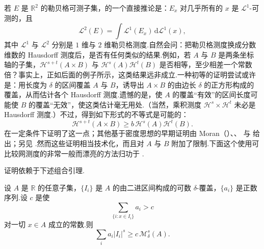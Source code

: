 若 $E$ 是 $\mathbb{R}^2$ 的勒贝格可测子集，的一个直接推论是：$E_x$ 对几乎所有的 $x$ 是 $\mathcal{L}^1$-可测的，且
\[
  \mathcal{L}^{2}(E)=\int\mathcal{L}^{1}(E_x)\,\mathrm{d}\mathscr{L}^{1}(x),
\]
其中 $\mathscr{L}^1$ 与 $\mathcal{L}^2$ 分别是 $1$ 维与 $2$ 维勒贝格测度.自然会问：把勒贝格测度换成分数维数的 Hausdorff 测度后，是否有任何类似的结果.例如，若 $A$ 与 $B$ 是两条坐标轴的子集，$\mathcal{H}^{s+t}(A\times B)$ 与 $\mathcal{H}^{s}(A)\mathcal{H}^{t}(B)$ 是否相等，至少相差一个常数倍？事实上，正如后面的例子所示，这类结果远非成立.一种初等的证明尝试或许是：用长度为 $\delta$ 的区间覆盖 $A$ 与 $B$，诱导出 $A\times B$ 的由边长 $\delta$ 的正方形构成的覆盖，从而估计各个 Hausdorff 测度.遗憾的是，使 $A$ 的覆盖``有效''的区间长度可能使 $B$ 的覆盖``无效''，使这类估计毫无用处.（当然，乘积测度 $\mathcal{H}^s\times\mathcal{H}^t$ 未必是 Hausdorff 测度.）不过，得到如下形式的不等式是可能的：
\[
  \mathcal{H}^{s+t}(A\times B)\geq b\,\mathcal{H}^{s}(A)\mathcal{H}^{t}(B).
\]
\textcite{besicovitchmoran1945} 在一定条件下证明了这一点；其他基于密度思想的早期证明由 Moran（\citeyear{moran1946,moran1949}）、\textcite{freilich1950}、\textcite{eggleston1950a} 与 \textcite{eggleston1953b} 给出；另见 \textcite{eggleston1950b}.然而这些证明相当技术化，而且对 $A$ 与 $B$ 附加了限制.下面这个使用可比较网测度的非常一般而漂亮的方法归功于 \textcite{marstrand1954b}.

证明依赖于下述组合引理.

\begin{lemma}\label{lem:5.7}
设 $A$ 是 $\mathbb{R}$ 的任意子集，$\{I_i\}$ 是 $A$ 的由二进区间构成的可数 $\delta$-覆盖，$\{a_i\}$ 是正数序列.设 $c$ 是使
\begin{equation}\label{eq:5.13}
  \sum_{\{i:x\in I_i\}}a_i>c
\end{equation}
对一切 $x\in A$ 成立的常数.则
\begin{equation}\label{eq:5.14}
  \sum_{i}a_i|I_i|^{s}\geq c\,\mathcal{M}^{s}_{\delta}(A).
\end{equation}
\end{lemma}

